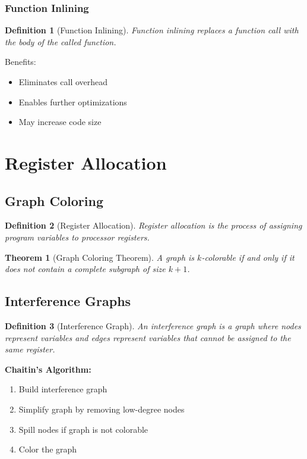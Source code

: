 \documentclass[11pt]{article}
\newtheorem{definition}{Definition}[section]
\newtheorem{theorem}{Theorem}[section]
\begin{document}
\subsubsection{Function Inlining}

\begin{definition}[Function Inlining]
Function inlining replaces a function call with the body of the called function.
\end{definition}

Benefits:
\begin{itemize}
    \item Eliminates call overhead
    \item Enables further optimizations
    \item May increase code size
\end{itemize}

\section{Register Allocation}

\subsection{Graph Coloring}

\begin{definition}[Register Allocation]
Register allocation is the process of assigning program variables to processor registers.
\end{definition}

\begin{theorem}[Graph Coloring Theorem]
A graph is $k$-colorable if and only if it does not contain a complete subgraph of size $k+1$.
\end{theorem}

\subsection{Interference Graphs}

\begin{definition}[Interference Graph]
An interference graph is a graph where nodes represent variables and edges represent variables that cannot be assigned to the same register.
\end{definition}

\textbf{Chaitin's Algorithm:}
\begin{enumerate}
    \item Build interference graph
    \item Simplify graph by removing low-degree nodes
    \item Spill nodes if graph is not colorable
    \item Color the graph
\end{enumerate}
\end{document}
